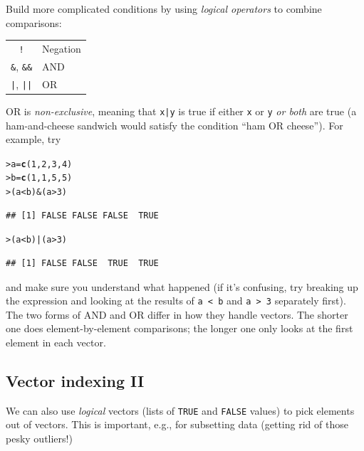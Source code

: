 \documentclass[11pt]{article}\usepackage[]{graphicx}\usepackage[]{color}
\makeatletter
\newcommand{\hlnum}[1]{\textcolor[rgb]{0.686,0.059,0.569}{#1}}%
\newcommand{\hlopt}[1]{\textcolor[rgb]{0,0,0}{#1}}%
\newcommand{\hlstd}[1]{\textcolor[rgb]{0.345,0.345,0.345}{#1}}%
\newcommand{\hlkwb}[1]{\textcolor[rgb]{0.69,0.353,0.396}{#1}}%
\newcommand{\hlkwd}[1]{\textcolor[rgb]{0.737,0.353,0.396}{\textbf{#1}}}%
\newenvironment{kframe}{%
 \def\at@end@of@kframe{}%
 \ifinner\ifhmode%
  \def\at@end@of@kframe{\end{minipage}}%
  \begin{minipage}{\columnwidth}%
 \fi\fi%
 \def\FrameCommand##1{\hskip\@totalleftmargin \hskip-\fboxsep
 \colorbox{shadecolor}{##1}\hskip-\fboxsep
     \hskip-\linewidth \hskip-\@totalleftmargin \hskip\columnwidth}%
 \MakeFramed {\advance\hsize-\width
   \@totalleftmargin\z@ \linewidth\hsize
   \@setminipage}}%
 {\par\unskip\endMakeFramed%
 \at@end@of@kframe}
\newenvironment{knitrout}{}{} %
\newcommand{\code}[1]{{\tt #1}}
\numberwithin{exercise}{section}
\makeatother
\begin{document}
Build more complicated conditions by using \emph{logical operators} to 
combine comparisons: 

\begin{tabular}{cl}
\code{!} &   Negation  \\
\verb!&!, \verb!&&! &     AND  \\
\verb!|!, \verb!||! &     OR 
\end{tabular}

\noindent OR is \emph{non-exclusive}, meaning that \code{x|y} is true 
if either \code{x} or \code{y} \emph{or both} are true
(a ham-and-cheese sandwich would satisfy the condition
``ham OR cheese'').
For example, try
\begin{knitrout}
\color{fgcolor}\begin{kframe}
\begin{alltt}
\hlstd{> }\hlstd{a} \hlkwb{=} \hlkwd{c}\hlstd{(}\hlnum{1}\hlstd{,} \hlnum{2}\hlstd{,} \hlnum{3}\hlstd{,} \hlnum{4}\hlstd{)}
\hlstd{> }\hlstd{b} \hlkwb{=} \hlkwd{c}\hlstd{(}\hlnum{1}\hlstd{,} \hlnum{1}\hlstd{,} \hlnum{5}\hlstd{,} \hlnum{5}\hlstd{)}
\hlstd{> }\hlstd{(a} \hlopt{<} \hlstd{b)} \hlopt{&} \hlstd{(a} \hlopt{>} \hlnum{3}\hlstd{)}
\end{alltt}
\begin{verbatim}
## [1] FALSE FALSE FALSE  TRUE
\end{verbatim}
\begin{alltt}
\hlstd{> }\hlstd{(a} \hlopt{<} \hlstd{b)} \hlopt{|} \hlstd{(a} \hlopt{>} \hlnum{3}\hlstd{)}
\end{alltt}
\begin{verbatim}
## [1] FALSE FALSE  TRUE  TRUE
\end{verbatim}
\end{kframe}
\end{knitrout}
\noindent and make sure you understand what happened
(if it's confusing, try breaking up the expression
and looking at the results of \verb+a < b+ and \verb+a > 3+
separately first). The two forms of AND
and OR differ in how they handle vectors. The shorter one does
element-by-element comparisons; the longer one only looks at the
first element in each vector. 

\subsection{Vector indexing II} 
We can also use \emph{logical} vectors (lists of \code{TRUE} and
\code{FALSE} values) to pick elements out of vectors.  This is
important, e.g., for subsetting data (getting rid of those pesky
outliers!)
\end{document}
